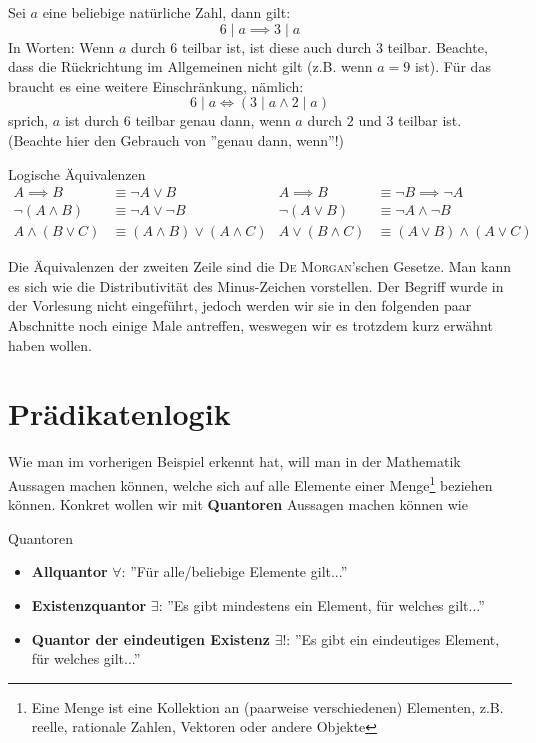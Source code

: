 \begin{example}[ ] Sei $a$ eine beliebige natürliche Zahl, dann gilt:
$$6 \mid a \implies 3 \mid a$$
In Worten: Wenn $a$ durch $6$ teilbar ist, ist diese auch durch $3$ teilbar. Beachte, dass die Rückrichtung im Allgemeinen nicht gilt (z.B. wenn $a = 9$ ist). Für das braucht es eine weitere Einschränkung, nämlich:
$$6 \mid a \iff (3 \mid a \land 2 \mid a)$$
sprich, $a$ ist durch $6$ teilbar genau dann, wenn $a$ durch $2$ und $3$ teilbar ist. (Beachte hier den Gebrauch von ''genau dann, wenn''!)
\end{example}

\begin{lemma}{Logische Äquivalenzen}{}
\begin{align*}
        A \implies B &\equiv \neg A \lor B  &  A \implies B &\equiv \neg B \implies \neg A\\
        \neg(A \land B) &\equiv \neg A \lor \neg B & \neg(A \lor B) &\equiv \neg A \land \neg B\\
        A \land (B \lor C) &\equiv (A \land B) \lor (A \land C) & A \lor (B \land C) &\equiv (A \lor B) \land (A \lor C)
\end{align*}
\end{lemma}
Die Äquivalenzen der zweiten Zeile sind die \textsc{De Morgan}'schen Gesetze. Man kann es sich wie die Distributivität des Minus-Zeichen vorstellen. Der Begriff wurde in der Vorlesung nicht eingeführt, jedoch werden wir sie in den folgenden paar Abschnitte noch einige Male antreffen, weswegen wir es trotzdem kurz erwähnt haben wollen.

\section{Prädikatenlogik}\label{cha_praedlogic}
Wie man im vorherigen Beispiel erkennt hat, will man in der Mathematik Aussagen machen können, welche sich auf alle  Elemente einer Menge\footnote{Eine Menge ist eine Kollektion an (paarweise verschiedenen) Elementen, z.B. reelle, rationale Zahlen, Vektoren oder andere Objekte} beziehen können. Konkret wollen wir mit \textbf{Quantoren} Aussagen machen können wie 
\begin{definition}{Quantoren}{}
    \begin{itemize}
    \item \textbf{Allquantor} $\forall$: ''Für alle/beliebige Elemente gilt...''
    \item \textbf{Existenzquantor} $\exists$: ''Es gibt mindestens ein Element, für welches gilt...''
    \item \textbf{Quantor der eindeutigen Existenz} $\exists!$: ''Es gibt ein eindeutiges Element, für welches gilt...''
\end{itemize}
\end{definition}

